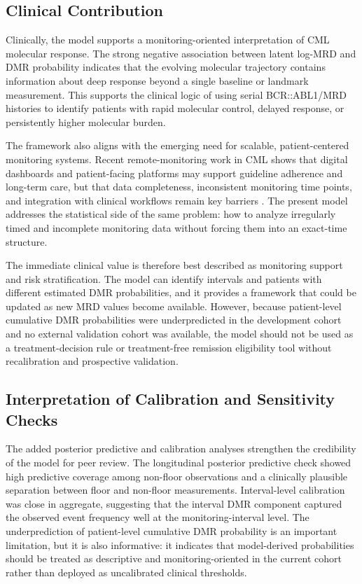 \subsection{Clinical Contribution}

Clinically, the model supports a monitoring-oriented interpretation of CML molecular response. The strong negative association between latent log-MRD and DMR probability indicates that the evolving molecular trajectory contains information about deep response beyond a single baseline or landmark measurement. This supports the clinical logic of using serial BCR::ABL1/MRD histories to identify patients with rapid molecular control, delayed response, or persistently higher molecular burden.

The framework also aligns with the emerging need for scalable, patient-centered monitoring systems. Recent remote-monitoring work in CML shows that digital dashboards and patient-facing platforms may support guideline adherence and long-term care, but that data completeness, inconsistent monitoring time points, and integration with clinical workflows remain key barriers \cite{Verweij2026RemoteMonitoring}. The present model addresses the statistical side of the same problem: how to analyze irregularly timed and incomplete monitoring data without forcing them into an exact-time structure.

The immediate clinical value is therefore best described as monitoring support and risk stratification. The model can identify intervals and patients with different estimated DMR probabilities, and it provides a framework that could be updated as new MRD values become available. However, because patient-level cumulative DMR probabilities were underpredicted in the development cohort and no external validation cohort was available, the model should not be used as a treatment-decision rule or treatment-free remission eligibility tool without recalibration and prospective validation.

\subsection{Interpretation of Calibration and Sensitivity Checks}

The added posterior predictive and calibration analyses strengthen the credibility of the model for peer review. The longitudinal posterior predictive check showed high predictive coverage among non-floor observations and a clinically plausible separation between floor and non-floor measurements. Interval-level calibration was close in aggregate, suggesting that the interval DMR component captured the observed event frequency well at the monitoring-interval level. The underprediction of patient-level cumulative DMR probability is an important limitation, but it is also informative: it indicates that model-derived probabilities should be treated as descriptive and monitoring-oriented in the current cohort rather than deployed as uncalibrated clinical thresholds.

